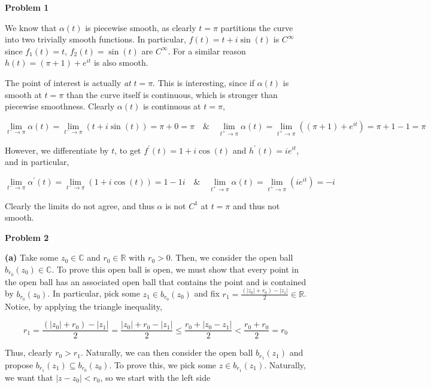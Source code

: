 \documentclass[10pt]{article}
\newcommand{\R}{\mathbb{R}}
\newcommand{\C}{\mathbb{C}}
\begin{document}
\textbf{Problem 1}

We know that $\alpha(t)$ is piecewise smooth, as clearly $t=\pi$ partitions the curve into two trivially smooth functions. In particular, $f(t) = t + i\sin(t)$ is $C^{\infty}$ since $f_{1}(t)=t$, $f_{2}(t)=\sin(t)$ are $C^{\infty}$. For a similar reason $h(t)=(\pi + 1) + e^{it}$ is also smooth.

The point of interest is actually \textit{at} $t=\pi$. This is interesting, since if $\alpha(t)$ is smooth at $t=\pi$ than the curve itself is continuous, which is stronger than piecewise smoothness. Clearly $\alpha(t)$ is continuous at $t=\pi$,

$$\lim_{t^{-}\to \pi} \alpha(t) = \lim_{t^{-}\to \pi} (t+i\sin(t)) = \pi + 0 = \pi \hspace{1em} \& \hspace{1em} \lim_{t^{+}\to \pi} \alpha(t) = \lim_{t^{+}\to \pi} ((\pi + 1) + e^{it}) = \pi + 1 - 1 = \pi$$

However, we differentiate by $t$, to get $f^{\prime}(t) = 1 + i\cos(t)$ and $h^{\prime}(t) = ie^{it}$, and in particular,

$$\lim_{t^{-}\to \pi} \alpha^{\prime}(t) = \lim_{t^{-}\to \pi} (1+i\cos(t)) = 1 - 1i \hspace{1em} \& \hspace{1em} \lim_{t^{+}\to \pi} \alpha(t) = \lim_{t^{+}\to \pi} (ie^{it}) =-i $$

Clearly the limits do not agree, and thus $\alpha$ is not $C^{1}$ at $t=\pi$ and thus not smooth.

\textbf{Problem 2}

\textbf{(a)}
Take some $z_{0} \in \C$ and $r_{0} \in \R$ with $r_{0} > 0$. Then, we consider the open ball $b_{r_{0}}(z_{0})\in \C$. To prove this open ball is open, we must show that every point in the open ball has an associated open ball that contains the point and is contained by $b_{r_{0}}(z_{0})$. In particular, pick some $z_{1} \in b_{r_{0}}(z_{0})$ and fix $r_{1} = \frac{(|z_{0}| +r_{0})  - |z_{1}|}{2} \in \R$. Notice, by applying the triangle inequality,

$$r_{1} = \frac{(|z_{0}|+r_{0}) - |z_{1}|}{2} = \frac{|z_{0}| + r_{0} - |z_{1}|}{2} \leq \frac{r_{0} + |z_{0}-z_{1}|}{2} < \frac{r_{0} + r_{0}}{2} = r_{0} $$

Thus, clearly $r_{0} > r_{1}$. Naturally, we can then consider the open ball $b_{r_{1}}(z_{1})$ and propose $b_{r_{1}}(z_{1}) \subseteq b_{r_{0}}(z_{0})$. To prove this, we pick some $z\in b_{r_{1}}(z_{1})$. Naturally, we want that $|z-z_{0}| < r_{0}$, so we start with the left side
\end{document}
